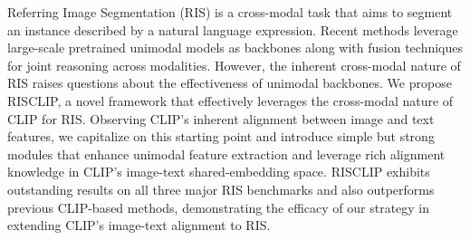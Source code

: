 Referring Image Segmentation (RIS) is a cross-modal task that aims to segment an instance described by a natural language expression. Recent methods leverage large-scale pretrained unimodal models as backbones along with fusion techniques for joint reasoning across modalities. However, the inherent cross-modal nature of RIS raises questions about the effectiveness of unimodal backbones. We propose RISCLIP, a novel framework that effectively leverages the cross-modal nature of CLIP for RIS. Observing CLIP's inherent alignment between image and text features, we capitalize on this starting point and introduce simple but strong modules that enhance unimodal feature extraction and leverage rich alignment knowledge in CLIP's image-text shared-embedding space. RISCLIP exhibits outstanding results on all three major RIS benchmarks and also outperforms previous CLIP-based methods, demonstrating the efficacy of our strategy in extending CLIP's image-text alignment to RIS.